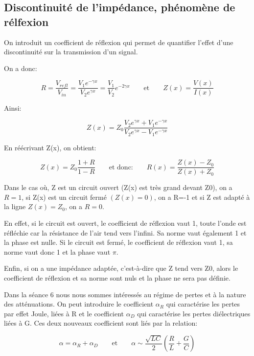 \documentclass[12pt,a4paper, french]{article}
\begin{document}
    \subsection{Discontinuité de l'impédance, phénomène de rélfexion}
    
    On introduit un coefficient de réflexion qui permet de quantifier l’effet d’une discontinuité sur la transmission d’un signal. 
    
    On a donc:
    \begin{center}
    \begin{equation*}
        R=\frac{V_{refl}}{V_{in}}=\frac{V_{1}e^{-\gamma x}}{V_{2}e^{\gamma x}}=\frac{V_1}{V_2}e^{-2\gamma x}\qquad\text{et}\qquad Z(x)=\frac{V(x)}{I(x)}    
    \end{equation*}
    \end{center}
        
    Ainsi:
    \begin{center}
    \begin{equation*}
        Z(x)=Z_0\frac{V_{2}e^{\gamma x}+V_{1}e^{-\gamma x}}{V_{2}e^{\gamma x}-V_{1}e^{-\gamma x}}
    \end{equation*}
    \end{center}
    
    En réécrivant Z(x), on obtient:
    \begin{center}
    \begin{equation*}
        Z(x)=Z_0\frac{1+R}{1-R}\qquad\text{et donc:}\qquad R(x)=\frac{Z(x)-Z_0}{Z(x)+Z_0}
    \end{equation*}
    \end{center}
    
    Dans le cas où, Z est un circuit ouvert (Z(x) est très grand devant Z0), on a $R=1$, si Z(x) est un circuit fermé $(Z(x)=0)$, on a R=-1 et si
     Z est adapté à la ligne $Z(x)=Z_0$, on a $R=0$. 
    
    En effet, si le circuit est ouvert, le coefficient de réflexion vaut 1, toute l’onde est réfléchie car la résistance de l’air tend vers l’infini.
    Sa norme vaut également 1 et la phase est nulle. Si le circuit est fermé, le coefficient de réflexion vaut 1, sa norme vaut donc 1 et la phase vaut $\pi $.
    
    Enfin, si on a une impédance adaptée, c’est-à-dire que Z tend vers Z0, alors le coefficient de réflexion et sa norme sont nuls et la phase ne sera pas définie.
    
    Dans la séance 6 nous nous sommes intéressés au régime de pertes et à la nature des atténuations.
    On peut introduire le coefficient $\alpha_{R}$ qui caractérise les pertes par effet Joule, liées à R et le coefficient $\alpha_{D}$ 
    qui caractérise les pertes diélectriques liées à G. Ces deux
     nouveaux coefficient sont liés par la relation:
     \begin{center}
    \begin{equation*}
            \alpha =\alpha_R+\alpha_D\qquad\text{et}\qquad\alpha \sim \frac{\sqrt{LC}}{2}(\frac{R}{L}+\frac{G}{C})
    \end{equation*}
    \end{center}
    
\end{document}
